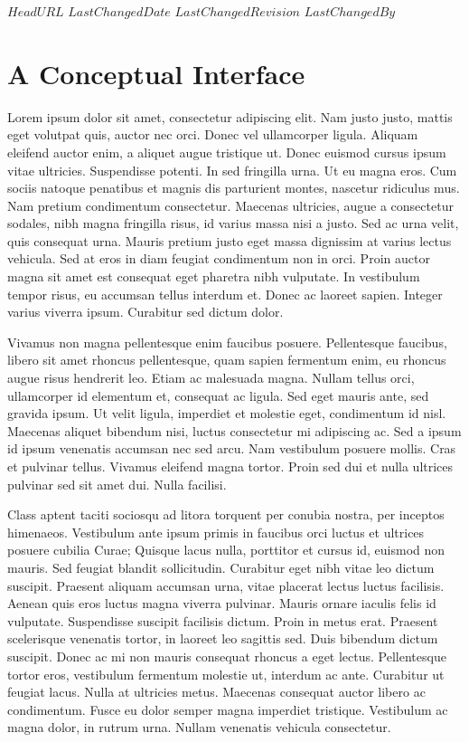 \svnidlong
{$HeadURL$}
{$LastChangedDate$}
{$LastChangedRevision$}
{$LastChangedBy$}

\chapter{A Conceptual Interface}
Lorem ipsum dolor sit amet, consectetur adipiscing elit.
Nam justo justo, mattis eget volutpat quis, auctor nec orci.
Donec vel ullamcorper ligula.
Aliquam eleifend auctor enim, a aliquet augue tristique ut.
Donec euismod cursus ipsum vitae ultricies.
Suspendisse potenti.
In sed fringilla urna.
Ut eu magna eros.
Cum sociis natoque penatibus et magnis dis parturient montes, nascetur ridiculus mus.
Nam pretium condimentum consectetur.
Maecenas ultricies, augue a consectetur sodales, nibh magna fringilla risus, id varius massa nisi a justo.
Sed ac urna velit, quis consequat urna.
Mauris pretium justo eget massa dignissim at varius lectus vehicula.
Sed at eros in diam feugiat condimentum non in orci.
Proin auctor magna sit amet est consequat eget pharetra nibh vulputate.
In vestibulum tempor risus, eu accumsan tellus interdum et.
Donec ac laoreet sapien.
Integer varius viverra ipsum.
Curabitur sed dictum dolor.

Vivamus non magna pellentesque enim faucibus posuere.
Pellentesque faucibus, libero sit amet rhoncus pellentesque, quam sapien fermentum enim, eu rhoncus augue risus hendrerit leo.
Etiam ac malesuada magna.
Nullam tellus orci, ullamcorper id elementum et, consequat ac ligula.
Sed eget mauris ante, sed gravida ipsum.
Ut velit ligula, imperdiet et molestie eget, condimentum id nisl.
Maecenas aliquet bibendum nisi, luctus consectetur mi adipiscing ac.
Sed a ipsum id ipsum venenatis accumsan nec sed arcu.
Nam vestibulum posuere mollis.
Cras et pulvinar tellus.
Vivamus eleifend magna tortor.
Proin sed dui et nulla ultrices pulvinar sed sit amet dui.
Nulla facilisi.

Class aptent taciti sociosqu ad litora torquent per conubia nostra, per inceptos himenaeos.
Vestibulum ante ipsum primis in faucibus orci luctus et ultrices posuere cubilia Curae; Quisque lacus nulla, porttitor et cursus id, euismod non mauris.
Sed feugiat blandit sollicitudin.
Curabitur eget nibh vitae leo dictum suscipit.
Praesent aliquam accumsan urna, vitae placerat lectus luctus facilisis.
Aenean quis eros luctus magna viverra pulvinar.
Mauris ornare iaculis felis id vulputate.
Suspendisse suscipit facilisis dictum.
Proin in metus erat.
Praesent scelerisque venenatis tortor, in laoreet leo sagittis sed.
Duis bibendum dictum suscipit.
Donec ac mi non mauris consequat rhoncus a eget lectus.
Pellentesque tortor eros, vestibulum fermentum molestie ut, interdum ac ante.
Curabitur ut feugiat lacus.
Nulla at ultricies metus.
Maecenas consequat auctor libero ac condimentum.
Fusce eu dolor semper magna imperdiet tristique.
Vestibulum ac magna dolor, in rutrum urna.
Nullam venenatis vehicula consectetur.

